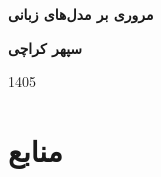 \documentclass[12pt,a4paper]{article}
\begin{document}
	
	\begin{titlepage}
		\centering
		\vspace*{2.5cm}
		{\Huge \bfseries \textcolor{blue!70!black}{مروری بر مدل‌های زبانی}\par}
		\vspace{16cm}
		{\Large \bfseries سپهر کراچی\par}
		\vspace{0.5cm}
		{\Large 1405\par}
		\vfill
	\end{titlepage}
	
	\newpage
	\renewcommand{\contentsname}{فهرست مطالب}
	\tableofcontents
	\newpage
	
	
	
	
	
	
	
	
	\newpage
	\section{منابع}
	\renewcommand{\refname}{منابع} 
	\begin{latin}
		\nocite{*}
		 
		 
	\end{latin}
	
\end{document}
